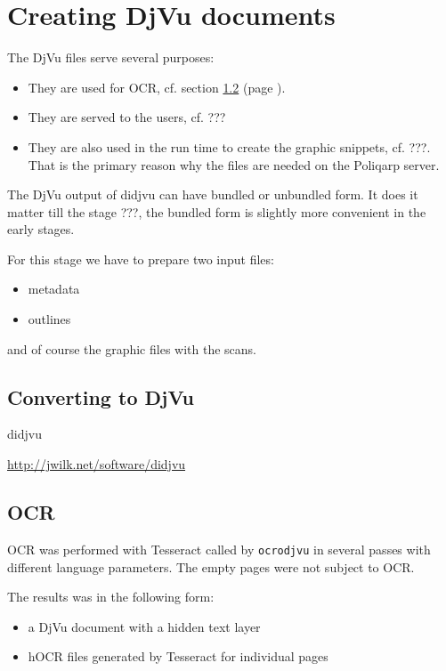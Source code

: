 \documentclass[runningheads,a4paper]{llncs}
\begin{document}
\section{Creating DjVu documents}
\label{sec:creat-djvu-docum}

The DjVu files serve several purposes:

\begin{itemize}
\item They are used for OCR, cf. section \ref{sec:ocr} (page \pageref{sec:ocr}).
\item They are served to the users, cf. ???
\item They are also used in the run time to create the graphic
  snippets, cf. ???. That is the primary reason why the files are
  needed on the Poliqarp server.
\end{itemize}

The DjVu output of didjvu can have bundled or unbundled form. It does
it matter till the stage ???, the bundled form is slightly more
convenient in the early stages.


For this stage we have to prepare two input files:
\begin{itemize}
\item metadata
\item outlines
\end{itemize}
and of course the graphic files with the scans.

\subsection{Converting to DjVu}
\label{sec:converting-djvu}




didjvu

\url{http://jwilk.net/software/didjvu}


\subsection{OCR}
\label{sec:ocr}

OCR was performed with Tesseract called by \texttt{ocrodjvu} in
several passes with different language parameters. The empty pages
were not subject to OCR.

The results was in the following form:
\begin{itemize}
\item a DjVu document with a hidden text layer
\item hOCR files generated by Tesseract for individual pages
\end{itemize}
\end{document}

